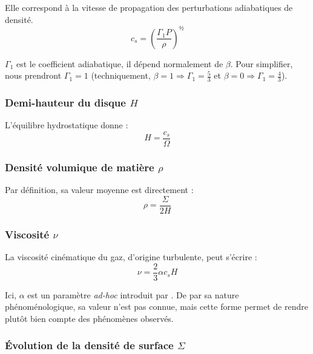 Elle correspond à la vitesse de propagation des perturbations adiabatiques de densité.
\begin{equation}
    \label{eq:vitesse_son}
    c_s = \left( \frac{\Gamma_1 P}{\rho} \right)^½
\end{equation}

$\Gamma_1$ est le coefficient adiabatique, il dépend normalement de $\beta$.
Pour simplifier, nous prendront $\Gamma_1 = 1$ (techniquement, $\beta = \num{1}
\Rightarrow \Gamma_1 = \frac{5}{3}$ et $\beta = \num{0} \Rightarrow \Gamma_1 =
\frac{4}{3}$).

\subsubsection{\texorpdfstring{Demi-hauteur du disque $H$}{Demi-hauteur du disque H}}

L’équilibre hydrostatique donne :
\begin{equation}
    \label{eq:hauteur}
    H = \frac{c_s}{\Omega}
\end{equation}

\subsubsection{\texorpdfstring{Densité volumique de matière $\rho$}{Densité volumique de matière ρ}}

Par définition, sa valeur moyenne est directement :
\begin{equation}
    \label{eq:densite}
    \rho = \frac{\Sigma}{2 H}
\end{equation}

\subsubsection{\texorpdfstring{Viscosité $\nu$}{Viscosité ν}}

La viscosité cinématique du gaz, d’origine turbulente, peut s’écrire :
\begin{equation}
    \label{eq:viscosite}
    \nu = \frac{2}{3} \alpha c_s H
\end{equation}

Ici, $\alpha$ est un paramètre \textit{ad-hoc} introduit par \citet{1973}. De
par sa nature phénoménologique, sa valeur n’est pas connue, mais cette forme
permet de rendre plutôt bien compte des phénomènes observés.

\subsubsection{\texorpdfstring{Évolution de la densité de surface $\Sigma$}{Évolution de la densité de surface Σ}}

